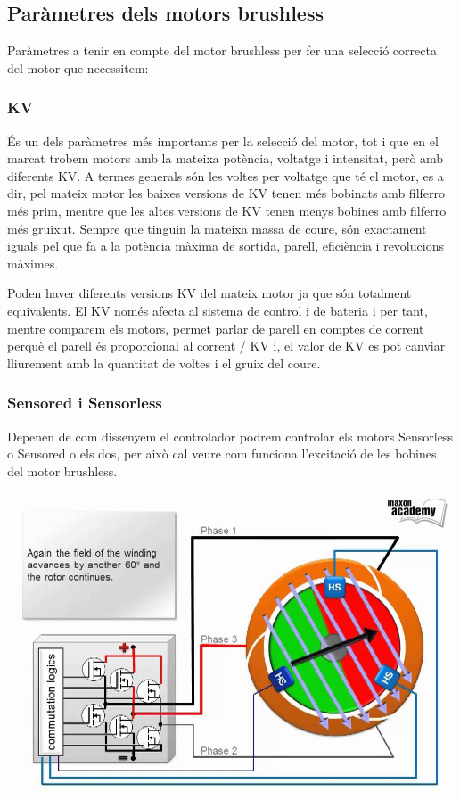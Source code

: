 \subsection{Paràmetres dels motors brushless}

Paràmetres a tenir en compte del motor brushless per fer una selecció correcta del motor que necessitem:\smallskip

\subsubsection{KV}
És un dels paràmetres més importants per la selecció del motor, tot i que en el marcat trobem motors amb la mateixa potència, voltatge i intensitat, però amb diferents KV. A termes generals són les voltes per voltatge que té el motor, es a dir, pel mateix motor les baixes versions de KV tenen més bobinats amb filferro més prim, mentre que les altes versions de KV tenen menys bobines amb filferro més gruixut. Sempre que tinguin la mateixa massa de coure, són exactament iguals pel que fa a la potència màxima de sortida, parell, eficiència i revolucions màximes.\smallskip
    
Poden haver diferents versions KV del mateix motor ja que són totalment equivalents. El KV només afecta al sistema de control i de bateria i per tant, mentre comparem els motors, permet parlar de parell en comptes de corrent perquè el parell és proporcional al corrent / KV i, el valor de KV es pot canviar lliurement amb la quantitat de voltes i el gruix del coure.\bigskip
     
\subsubsection{Sensored i Sensorless}

Depenen de com dissenyem el controlador podrem controlar els motors Sensorless o Sensored o els dos, per això cal veure com funciona l'excitació de les bobines del motor brushless.\smallskip
    
\includegraphics[width=\textwidth]{bobinas}
    
